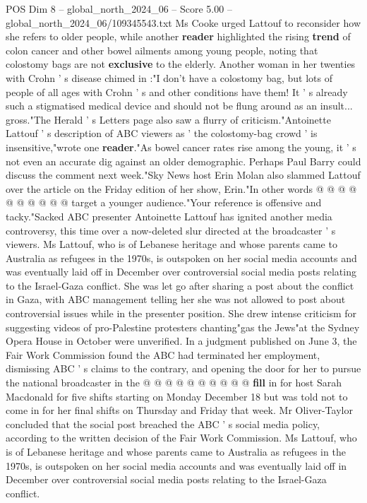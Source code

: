 \begin{textsample}{POS Dim 8 – global\_north\_2024\_06 – Score 5.00 – global\_north\_2024\_06/109345543.txt}  \label{ex:f8_pos_254}
Ms Cooke urged Lattouf to reconsider how she refers to older people, while another \textbf{reader} highlighted the rising \textbf{trend} of colon cancer and other bowel ailments among young people, noting that colostomy bags are not \textbf{exclusive} to the elderly.
Another woman in her twenties with Crohn ' s disease chimed in :"I don't have a colostomy bag, but lots of people of all ages with Crohn ' s and other conditions have them!
It ' s already such a stigmatised medical device and should not be flung around as an insult... gross."The Herald ' s Letters page also saw a flurry of criticism."Antoinette Lattouf ' s description of ABC viewers as ' the colostomy-bag crowd ' is insensitive,"wrote one \textbf{reader}."As bowel cancer rates rise among the young, it ' s not even an accurate dig against an older demographic.
Perhaps Paul Barry could discuss the comment next week."Sky News host Erin Molan also slammed Lattouf over the article on the Friday edition of her show, Erin."In other words @ @ @ @ @ @ @ @ @ @ target a younger audience."Your reference is offensive and tacky."Sacked ABC presenter Antoinette Lattouf has ignited another media controversy, this time over a now-deleted slur directed at the broadcaster ' s viewers.
Ms Lattouf, who is of Lebanese heritage and whose parents came to Australia as refugees in the 1970s, is outspoken on her social media accounts and was eventually laid off in December over controversial social media posts relating to the Israel-Gaza conflict.
She was let go after sharing a post about the conflict in Gaza, with ABC management telling her she was not allowed to post about controversial issues while in the presenter position.
She drew intense criticism for suggesting videos of pro-Palestine protesters chanting"gas the Jews"at the Sydney Opera House in October were unverified.
In a judgment published on June 3, the Fair Work Commission found the ABC had terminated her employment, dismissing ABC ' s claims to the contrary, and opening the door for her to pursue the national broadcaster in the @ @ @ @ @ @ @ @ @ @ \textbf{fill} in for host Sarah Macdonald for five shifts starting on Monday December 18 but was told not to come in for her final shifts on Thursday and Friday that week.
Mr Oliver-Taylor concluded that the social post breached the ABC ' s social media policy, according to the written decision of the Fair Work Commission.
Ms Lattouf, who is of Lebanese heritage and whose parents came to Australia as refugees in the 1970s, is outspoken on her social media accounts and was eventually laid off in December over controversial social media posts relating to the Israel-Gaza conflict.

\end{textsample}
